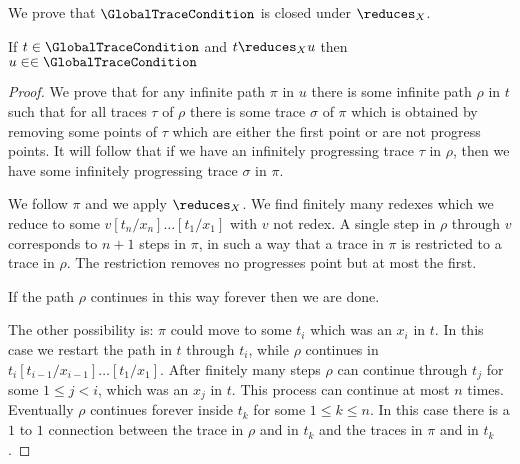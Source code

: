 We prove that $\GlobalTraceCondition$ is closed under $\reduces_X$.


\begin{lemma}
If $t \in \GlobalTraceCondition$ and $t \reduces_X u$ then $u \in \in \GlobalTraceCondition$
\end{lemma}

\begin{proof}
We prove that for any infinite path $\pi$ in $u$ there is some infinite path $\rho$ in $t$ such that
for all traces $\tau$ of $\rho$ there is some trace $\sigma$ of $\pi$ which is obtained by
removing some points of $\tau$ which are either the first point or are not progress points. 
It will follow that if we have an infinitely progressing trace $\tau$ in $\rho$, then we have some infinitely
progressing trace $\sigma$ in $\pi$.

We follow $\pi$ and we apply $\reduces_X$. We find finitely many redexes which we reduce to
some $v[t_n/x_n]\ldots[t_1/x_1]$ with $v$ not redex. A single step in $\rho$ through $v$
corresponds to $n+1$ steps in $\pi$, in such a way that a trace in $\pi$ is restricted to a trace
in $\rho$. The restriction removes no progresses point but at most the first. 

If the path $\rho$ continues in this way forever then we are done.

The other possibility is: $\pi$ could move to some $t_i$ which was an $x_i$ in $t$. In this case we restart
the path in $t$ through $t_i$, while $\rho$ continues in $t_i[t_{i-1}/x_{i-1}]\ldots[t_1/x_1]$.
After finitely many steps $\rho$ can continue through $t_j$ for some $1 \le j < i$, which was an $x_j$
in $t$. This process can continue at most $n$ times. 
Eventually $\rho$ continues forever inside $t_k$ for some $1 \le k \le n$. In this case there is a $1$ to $1$
connection between the trace in $\rho$ and in $t_k$ and the traces in $\pi$ and in $t_k$.
\end{proof}
